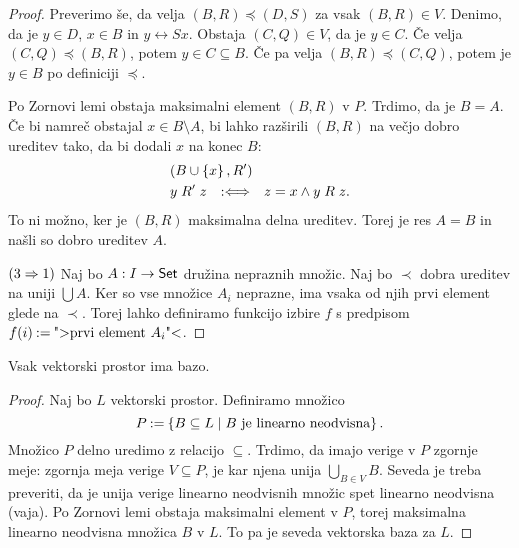\begin{proof}
  Preverimo še, da velja $(B,R) \preceq (D,S)$ za vsak $(B,R) \in V$. Denimo, da je $y \in D$,
  $x \in B$ in $y \rel{S} x$. Obstaja $(C,Q) \in V$, da je $y \in C$. Če velja $(C,Q) \preceq (B,R)$,
  potem $y \in C \subseteq B$. Če pa velja $(B,R) \preceq (C,Q)$, potem je $y \in B$ po definiciji $\preceq$.

  Po Zornovi lemi obstaja maksimalni element $(B,R)$ v $P$. Trdimo, da je $B = A$. Če bi namreč
  obstajal $x \in B \setminus A$, bi lahko razširili $(B,R)$ na večjo dobro ureditev tako, da bi dodali $x$
  na konec $B$:
  \begin{align*}
    & (B \cup \left\{x\right\}, R') \\
    & y \mathrel{R'} z \quad {{:}{\Longleftrightarrow}}\quad z = x \land y \mathrel{R} z.
  \end{align*}
  To ni možno, ker je $(B,R)$ maksimalna delna ureditev. Torej je res $A = B$ in
  našli so dobro ureditev $A$.

  $(3 \Rightarrow 1)$ Naj bo $A : I \to \mathsf{Set}$ družina nepraznih množic. Naj bo $\prec$ dobra ureditev
  na uniji $\bigcup A$. Ker so vse množice $A_i$ neprazne, ima vsaka od njih prvi element
  glede na $\prec$. Torej lahko definiramo funkcijo izbire $f$ s predpisom
  $f(i) \mathbin{{:}{=}} \text{">prvi element $A_i$"<}$.
\end{proof}

\begin{izrek}
  Vsak vektorski prostor ima bazo.
\end{izrek}

\begin{proof}
  Naj bo $L$ vektorski prostor. Definiramo množico
  \begin{equation*}
    P \mathbin{{:}{=}} \left\{ B \subseteq L \mid \text{$B$ je linearno neodvisna} \right\}.
  \end{equation*}
  Množico $P$ delno uredimo z relacijo $\subseteq$. Trdimo, da imajo verige v $P$ zgornje
  meje: zgornja meja verige $V \subseteq P$, je kar njena unija $\bigcup_{B \in V} B$. Seveda je
  treba preveriti, da je unija verige linearno neodvisnih množic spet linearno
  neodvisna (vaja). Po Zornovi lemi obstaja maksimalni element v $P$, torej
  maksimalna linearno neodvisna množica $B$ v $L$. To pa je seveda vektorska baza
  za $L$.
\end{proof}
